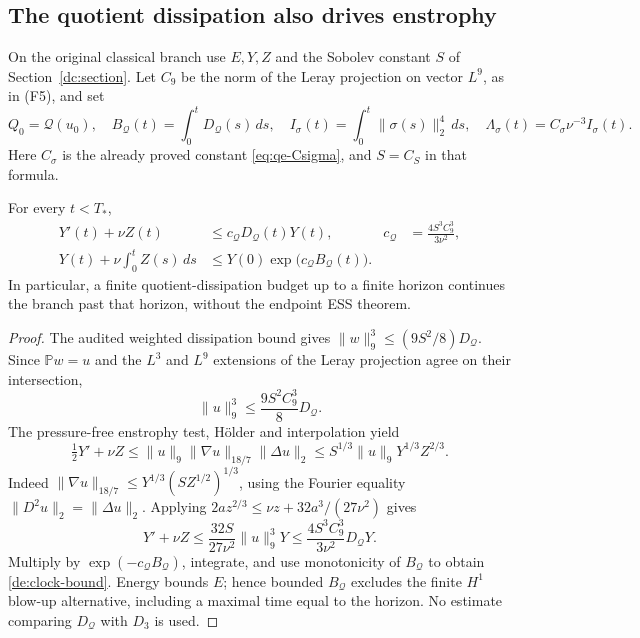 \subsection{The quotient dissipation also drives enstrophy}

On the original classical branch use $E,Y,Z$ and the Sobolev constant $S$
of Section~\ref{dc:section}.  Let $C_9$ be the norm of the Leray
projection on vector $L^9$, as in \textup{(F5)}, and set
\[
 Q_0=\mathcal Q(u_0),\quad
 B_{\mathcal Q}(t)=\int_0^tD_{\mathcal Q}(s)\,ds,\quad
 I_\sigma(t)=\int_0^t\|\sigma(s)\|_2^4\,ds,\quad
 \Lambda_\sigma(t)=C_\sigma\nu^{-3}I_\sigma(t).
\]
Here $C_\sigma$ is the already proved constant
\eqref{eq:qe-Csigma}, and $S=C_S$ in that formula.

\begin{proposition}
\label{de:quotient-clock}
For every $t<T_*$,
\begin{align}
 Y'(t)+\nu Z(t)&\le c_{\mathcal Q}D_{\mathcal Q}(t)Y(t),
 &c_{\mathcal Q}&=\frac{4S^3C_9^3}{3\nu^2},\label{de:clock-diff}\\
 Y(t)+\nu\int_0^tZ(s)\,ds
 &\le Y(0)\exp\bigl(c_{\mathcal Q}B_{\mathcal Q}(t)\bigr).
 &&\label{de:clock-bound}
\end{align}
In particular, a finite quotient-dissipation budget up to a finite horizon
continues the branch past that horizon, without the endpoint ESS theorem.
\end{proposition}
\begin{proof}
The audited weighted dissipation bound gives
$\|w\|_9^3\le(9S^2/8)D_{\mathcal Q}$.  Since $\mathbb Pw=u$ and the
$L^3$ and $L^9$ extensions of the Leray projection agree on their
intersection,
\[
 \|u\|_9^3\le\frac{9S^2C_9^3}{8}D_{\mathcal Q}.
\]
The pressure-free enstrophy test, H\"older and interpolation yield
\[
 \tfrac12Y'+\nu Z
 \le\|u\|_9\|\nabla u\|_{18/7}\|\Delta u\|_2
 \le S^{1/3}\|u\|_9Y^{1/3}Z^{2/3}.
\]
Indeed $\|\nabla u\|_{18/7}\le Y^{1/3}(S Z^{1/2})^{1/3}$, using
the Fourier equality $\|D^2u\|_2=\|\Delta u\|_2$.  Applying
$2az^{2/3}\le\nu z+32a^3/(27\nu^2)$ gives
\[
 Y'+\nu Z\le\frac{32S}{27\nu^2}\|u\|_9^3Y
 \le\frac{4S^3C_9^3}{3\nu^2}D_{\mathcal Q}Y.
\]
Multiply by $\exp(-c_{\mathcal Q}B_{\mathcal Q})$, integrate, and use
monotonicity of $B_{\mathcal Q}$ to obtain \eqref{de:clock-bound}.
Energy bounds $E$; hence bounded $B_{\mathcal Q}$ excludes the finite
$H^1$ blow-up alternative, including a maximal time equal to the horizon.
No estimate comparing $D_{\mathcal Q}$ with $D_3$ is used.
\end{proof}

